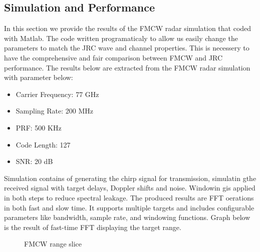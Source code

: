 \documentclass[conference]{IEEEtran}
\begin{document}
\begin{enumerate}
\subsection {Simulation and Performance}

In this section we provide the results of the FMCW radar simulation that coded with Matlab. The code written programaticaly to allow us easily change the parameters to match the JRC wave and channel properties. This is necessery to have the comprehensive and fair comparison between FMCW and JRC performance. 
The results below are extracted from the FMCW  radar simulation with parameter below:
	\begin{itemize}
	\item Carrier Frequency:	77 GHz
	\item Sampling Rate:		200 MHz
	\item PRF:				500 KHz
	\item Code Length:		127
	\item SNR:				20 dB
	\end{itemize}
	
Simulation contains of generating the chirp signal for transmission, simulatin gthe received signal with target delays, Doppler shifts and noise. Windowin gis applied in both steps to reduce spectral leakage. The produced results are  FFT oerations in both fast and slow time. It supports multiple targets and includes configurable parameters like bandwidth, sample rate, and windowing functions. Graph below is the result of fast-time FFT displaying the target range.

	\begin{figure}[H]
	    		\centering
	    		\caption{FMCW range slice}
		\end{figure}


\end{enumerate}
\end{document}
